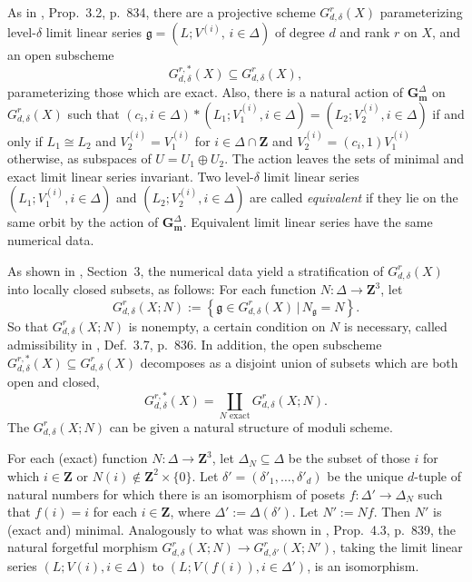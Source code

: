 \documentclass[a4paper,11pt]{amsart}
\theoremstyle{plain}
\theoremstyle{definition}
\theoremstyle{remark}
\def\z{\mathbf{Z}}
\def\cc{{\mathbf G}_{\mathbf m}}
\def\:{\colon}
\begin{document}
As in \cite{ENR}, Prop.~3.2, p.~834, there are a projective
scheme $G_{d,\delta}^r(X)$ parameterizing level-$\delta$
limit linear series $\mathfrak g=(L;V^{(i)},\,i\in\Delta)$ of degree $d$ and rank $r$ on $X$, and an open
subscheme
$$
G^{r,*}_{d,\delta}(X)\subseteq
G^{r}_{d,\delta}(X),
$$
parameterizing those which are exact. Also, there is a natural action of 
$\cc^\Delta$ on $G_{d,\delta}^r(X)$ such that 
$(c_i,i\in\Delta)\ast(L_1;V_1^{(i)},i\in\Delta)=(L_2; V_2^{(i)},i\in\Delta)$ if and only if $L_1\cong L_2$ and $V_2^{(i)}=V_1^{(i)}$ for $i\in\Delta\cap\mathbf Z$ and $V_2^{(i)}=(c_i,1)V_1^{(i)}$ otherwise, as subspaces of $U=U_1\oplus U_2$. The action leaves the sets of minimal and exact limit linear series invariant. Two level-$\delta$ limit linear series 
$(L_1;V_1^{(i)},i\in\Delta)$ and $(L_2;V_2^{(i)},i\in\Delta)$ are called \emph{equivalent} if they lie on the same orbit by the action of $\cc^{\Delta}$. Equivalent limit linear series have the same numerical data.

As shown in \cite{ENR}, Section~3, the numerical data yield a stratification of $G^r_{d,\delta}(X)$ into locally closed subsets, as follows: For each 
function $N\:\Delta\to\z^3$, let
\[
G_{d,\delta}^r(X;N):=\left\{\mathfrak{g}\in 
G_{d,\delta}^r(X)\,|\, N_{\mathfrak g}=N\right\}.
\]
So that $G_{d,\delta}^r(X;N)$ is nonempty, a certain condition on $N$ is necessary, called admissibility in \cite{ENR}, Def.~3.7, p.~836. In addition, the open
subscheme $G^{r,*}_{d,\delta}(X)\subseteq G^{r}_{d,\delta}(X)$ decomposes as a disjoint union of subsets which are both open and closed,
\begin{equation}\label{estrata}
G_{d,\delta}^{r,*}(X)=\coprod_{N\text{ exact}}
G_{d,\delta}^r(X;N).
\end{equation}
The $G_{d,\delta}^r(X;N)$ can be given a natural structure of moduli scheme.

For each (exact) function $N\:\Delta\to\mathbf Z^3$, let $\Delta_N\subseteq\Delta$ be the subset of those $i$ for which $i\in\mathbf Z$ or $N(i)\not\in\mathbf Z^2\times\{0\}$. Let $\delta'=(\delta'_1,\dots,\delta'_d)$ be the unique $d$-tuple of natural numbers for which there is an isomorphism of posets $f\:\Delta'\to\Delta_N$ such that $f(i)=i$ for each $i\in\z$, 
where $\Delta':=\Delta(\delta')$. Let $N':=Nf$. Then $N'$ is (exact and) minimal. Analogously to what was shown in \cite{ENR}, Prop.~4.3, p.~839, the natural forgetful morphism $G_{d,\delta}^r(X;N)\to G_{d,\delta'}^r(X;N')$, taking the limit linear series $(L;V(i),i\in\Delta)$ to $(L;V(f(i)),i\in\Delta')$, is an isomorphism.
\end{document}
